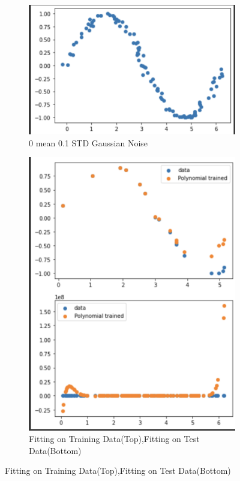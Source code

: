\documentclass[a4paper]{article}
\theoremstyle{definition}
\newenvironment{soln}{
    \leavevmode\color{blue}\ignorespaces
}{}
\begin{document}
\begin{soln}
\begin{figure}[H]
\begin{subfigure}{0.5\textwidth}
            \includegraphics[scale=0.5]{0.1GNoise.png}
            \caption{0 mean 0.1 STD Gaussian Noise}
            \label{fig:q2}
            \end{subfigure}%
            \begin{subfigure}{0.5\textwidth}
            \centering
            \includegraphics[scale=0.5]{TrnTest.png}
            \caption{Fitting on Training Data(Top),Fitting on Test Data(Bottom)}
            \label{fig:q2}
            \end{subfigure}%
        \end{figure} 
        \begin{center}
            

\end{center}
\end{soln}
\end{document}
